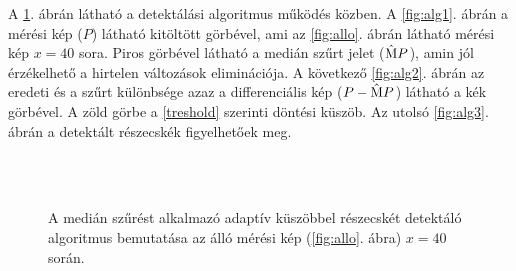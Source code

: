 	A \ref{fig:alg}. ábrán látható a detektálási algoritmus működés közben.
	A \ref{fig:alg1}. ábrán a mérési kép ($P$) látható kitöltött görbével, ami az \ref{fig:allo}. ábrán
	látható mérési kép $x=40$ sora.
	Piros görbével látható a medián szűrt jelet ($\mathrm{\hat{M}}P$), amin jól érzékelhető a hirtelen
	változások eliminációja.
	A következő \ref{fig:alg2}. ábrán az eredeti és a szűrt különbsége azaz a differenciális kép
	($P - \mathrm{\hat{M}}P$) látható a kék görbével. A zöld görbe a \eqref{treshold} szerinti
	döntési küszöb.
	Az utolsó \ref{fig:alg3}. ábrán a detektált részecskék figyelhetőek meg.
	
	\begin{figure}[!h]
		\centering
		\\
		\\
		\caption[Adaptív küszöb bemutatása]{A medián szűrést alkalmazó adaptív küszöbbel részecskét
		detektáló algoritmus bemutatása az álló mérési kép (\ref{fig:allo}. ábra) $x=40$ során.}
		\label{fig:alg}
	\end{figure}
	
